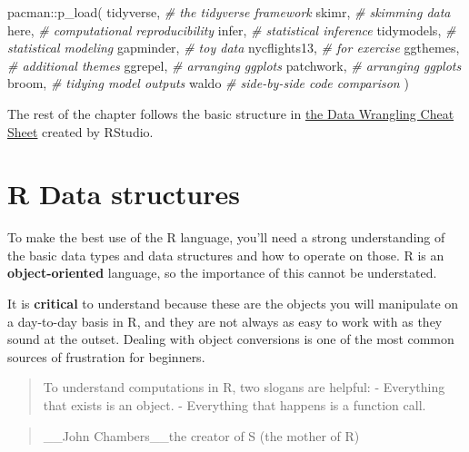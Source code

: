 \documentclass[
]{book}
\newenvironment{Shaded}{\begin{snugshade}}{\end{snugshade}}
\newcommand{\CommentTok}[1]{\textcolor[rgb]{0.56,0.35,0.01}{\textit{#1}}}
\newcommand{\FunctionTok}[1]{\textcolor[rgb]{0.00,0.00,0.00}{#1}}
\newcommand{\NormalTok}[1]{#1}
\newcommand{\SpecialCharTok}[1]{\textcolor[rgb]{0.00,0.00,0.00}{#1}}
\begin{document}
\begin{Shaded}
\begin{Highlighting}[]
\NormalTok{pacman}\SpecialCharTok{::}\FunctionTok{p\_load}\NormalTok{(}
\NormalTok{  tidyverse, }\CommentTok{\# the tidyverse framework}
\NormalTok{  skimr, }\CommentTok{\# skimming data }
\NormalTok{  here, }\CommentTok{\# computational reproducibility}
\NormalTok{  infer, }\CommentTok{\# statistical inference }
\NormalTok{  tidymodels, }\CommentTok{\# statistical modeling }
\NormalTok{  gapminder, }\CommentTok{\# toy data}
\NormalTok{  nycflights13, }\CommentTok{\# for exercise}
\NormalTok{  ggthemes, }\CommentTok{\# additional themes}
\NormalTok{  ggrepel, }\CommentTok{\# arranging ggplots}
\NormalTok{  patchwork, }\CommentTok{\# arranging ggplots}
\NormalTok{  broom, }\CommentTok{\# tidying model outputs}
\NormalTok{  waldo }\CommentTok{\# side{-}by{-}side code comparison}
\NormalTok{)}
\end{Highlighting}
\end{Shaded}

The rest of the chapter follows the basic structure in \href{https://rstudio.com/wp-content/uploads/2015/02/data-wrangling-cheatsheet.pdf}{the Data Wrangling Cheat Sheet} created by RStudio.

\hypertarget{r-data-structures}{%
\section{R Data structures}\label{r-data-structures}}

To make the best use of the R language, you'll need a strong understanding of the basic data types and data structures and how to operate on those. R is an \textbf{object-oriented} language, so the importance of this cannot be understated.

It is \textbf{critical} to understand because these are the objects you will manipulate on a day-to-day basis in R, and they are not always as easy to work with as they sound at the outset. Dealing with object conversions is one of the most common sources of frustration for beginners.

\begin{quote}
To understand computations in R, two slogans are helpful:
- Everything that exists is an object.
- Everything that happens is a function call.
\end{quote}

\begin{quote}
\_\_John Chambers\_\_the creator of S (the mother of R)
\end{quote}
\end{document}
